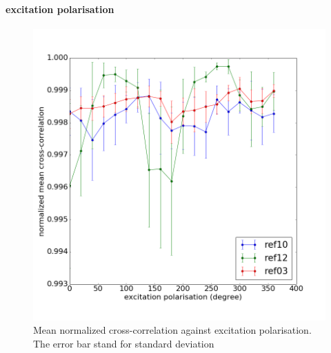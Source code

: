 \paragraph{excitation polarisation}

\begin{figure}[h]
\centering
\includegraphics[width=0.7\linewidth]{"Figures/pic/excitation polarisation"}
\caption{Mean normalized cross-correlation against excitation polarisation. The error bar stand for standard deviation}
\label{fig:excitation-polarisation of untreated nanodiamond batch 2}
\end{figure}


